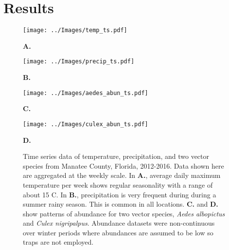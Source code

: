 \section{Results}


\begin{figure}[h!]

		\begin{minipage}[]{.51\textwidth}
			\texttt{[image: ../Images/temp\_ts.pdf]}
			
			\hspace{4.3cm}\textbf{A.}\\
		\end{minipage}
		\begin{minipage}[]{.47\textwidth}
			\texttt{[image: ../Images/precip\_ts.pdf]}
			
			\hspace{4.4cm}\textbf{B.}\\
		\end{minipage}
	
	
		\begin{minipage}[]{.5\textwidth}
			\texttt{[image: ../Images/aedes\_abun\_ts.pdf]}
			
			\hspace{4.3cm}\textbf{C.}\\
		\end{minipage}
		\begin{minipage}[]{.5\textwidth}
			\texttt{[image: ../Images/culex\_abun\_ts.pdf]}
			
			\hspace{4.5cm}\textbf{D.}\\
		\end{minipage}
		
	\label{fig: ts_plots}
	\caption{Time series data of temperature, precipitation, and two vector species from Manatee County, Florida, 2012-2016. Data shown here are aggregated at the weekly scale. In \textbf{A.}, average daily maximum temperature per week shows regular seasonality with a range of about 15 \degree C. In \textbf{B.}, precipitation is very frequent during during a summer rainy season. This is common in all locations. \textbf{C.} and \textbf{D.} show patterns of abundance for two vector species, \textit{Aedes albopictus} and \textit{Culex nigripalpus}. Abundance datasets were non-continuous over winter periods where abundances are assumed to be low so traps are not employed.}

\end{figure}

